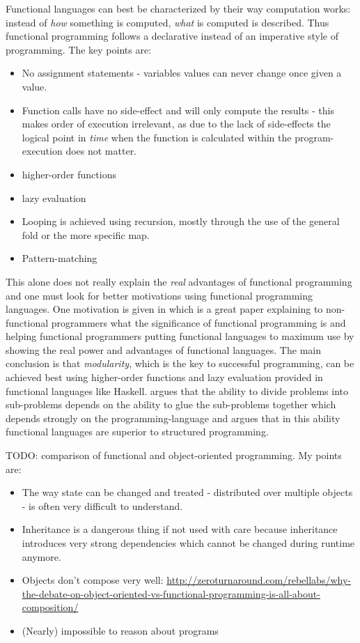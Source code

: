 Functional languages can best be characterized by their way computation works: instead of \textit{how} something is computed, \textit{what} is computed is described. Thus functional programming follows a declarative instead of an imperative style of programming. The key points are:
\begin{itemize}
\item No assignment statements - variables values can never change once given a value.
\item Function calls have no side-effect and will only compute the results - this makes order of execution irrelevant, as due to the lack of side-effects the logical point in \textit{time} when the function is calculated within the program-execution does not matter.
\item higher-order functions
\item lazy evaluation
\item Looping is achieved using recursion, mostly through the use of the general fold or the more specific map.
\item Pattern-matching
\end{itemize}

This alone does not really explain the \textit{real} advantages of functional programming and one must look for better motivations using functional programming languages. One motivation is given in \cite{Hughes1989} which is a great paper explaining to non-functional programmers what the significance of functional programming is and helping functional programmers putting functional languages to maximum use by showing the real power and advantages of functional languages. The main conclusion is that \textit{modularity}, which is the key to successful programming, can be achieved best using higher-order functions and lazy evaluation provided in functional languages like Haskell. \cite{Hughes1989} argues that the ability to divide problems into sub-problems depends on the ability to glue the sub-problems together which depends strongly on the programming-language and \cite{Hughes1989} argues that in this ability functional languages are superior to structured programming.

TODO: comparison of functional and object-oriented programming. My points are:
\begin{itemize}
\item The way state can be changed and treated - distributed over multiple objects - is often very difficult to understand.
\item Inheritance is a dangerous thing if not used with care because inheritance introduces very strong dependencies which cannot be changed during runtime anymore.
\item Objects don't compose very well: \url{http://zeroturnaround.com/rebellabs/why-the-debate-on-object-oriented-vs-functional-programming-is-all-about-composition/}
\item (Nearly) impossible to reason about programs
\end{itemize}

